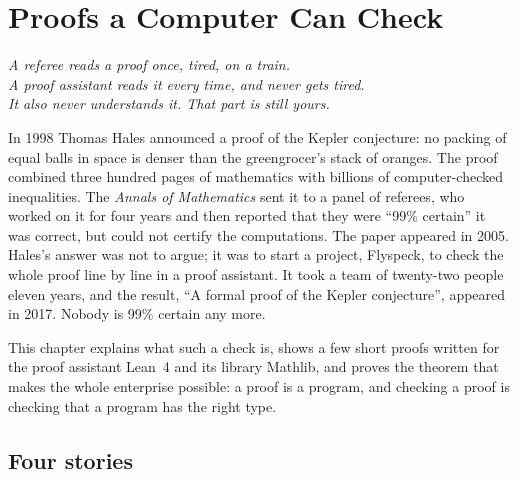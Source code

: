 \chapter{Proofs a Computer Can Check}
\label{ch:lean}

\begin{center}\itshape
A referee reads a proof once, tired, on a train.\\
A proof assistant reads it every time, and never gets tired.\\
It also never understands it. That part is still yours.
\end{center}

In 1998 Thomas Hales announced a proof of the Kepler conjecture: no packing of equal balls in space is denser than the greengrocer's stack of oranges. The proof combined
three hundred pages of mathematics with billions of computer-checked inequalities. The \emph{Annals of Mathematics} sent it to a panel of referees, who worked on it for four
years and then reported that they were ``99\% certain'' it was correct, but could not certify the computations. The paper appeared in 2005. Hales's answer was not to argue; it was
to start a project, Flyspeck, to check the whole proof line by line in a proof assistant. It took a team of twenty-two people eleven years, and the result, ``A formal proof of the
Kepler conjecture'', appeared in 2017. Nobody is 99\% certain any more.

This chapter explains what such a check is, shows a few short proofs written for the proof assistant Lean~4 and its library Mathlib, and proves the theorem that makes the
whole enterprise possible: a proof is a program, and checking a proof is checking that a program has the right type.

\section{Four stories}

